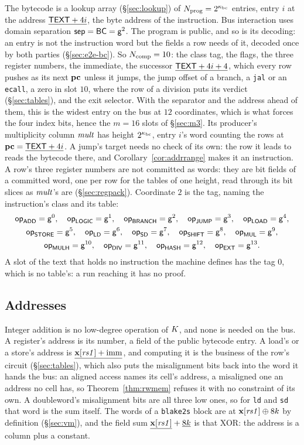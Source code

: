 The bytecode is a lookup array (\S\ref{sec:lookup}) of $N_{\mathrm{prog}} = 2^{\kappa_{\mathrm{bc}}}$ entries, entry $i$ at the address $\underline{\mathsf{TEXT}+4i}$, the byte address of the instruction. Bus interaction uses domain separation $\mathsf{sep}=\mathsf{BC} = \mathsf{g}^{2}$. The program is public, and so is its decoding: an entry is not the instruction word but the fields a row needs of it, decoded once by both parties (\S\ref{sec:e2e-bc}). So $N_{\mathrm{comp}}=10$: the class tag, the flags, the three register numbers, the immediate, the successor $\underline{\mathsf{TEXT}+4i+4}$, which every row pushes as its next $\mathbf{pc}$ unless it jumps, the jump offset of a branch, a \texttt{jal} or an \texttt{ecall}, a zero in slot $10$, where the row of a division puts its verdict (\S\ref{sec:tables}), and the exit selector. With the separator and the address ahead of them, this is the widest entry on the bus at $12$ coordinates, which is what forces the four index bits, hence the $m=16$ slots of \S\ref{sec:m3}. Its producer's multiplicity column $\mathit{mult}$ has height $2^{\kappa_{\mathrm{bc}}}$, entry $i$'s word counting the rows at $\mathbf{pc}=\underline{\mathsf{TEXT}+4i}$. A jump's target needs no check of its own: the row it leads to reads the bytecode there, and Corollary~\ref{cor:addrrange} makes it an instruction. A row's three register numbers are not committed as words: they are bit fields of a committed word, one per row for the tables of one height, read through its bit slices as $\mathit{mult}$'s are (\S\ref{sec:regpack}). Coordinate $2$ is the tag, naming the instruction's class and its table:
\begin{gather*}
  \mathsf{op}_{\mathsf{ADD}}=\mathsf{g}^{0},\quad \mathsf{op}_{\mathsf{LOGIC}}=\mathsf{g}^{1},\quad \mathsf{op}_{\mathsf{BRANCH}}=\mathsf{g}^{2},\quad \mathsf{op}_{\mathsf{JUMP}}=\mathsf{g}^{3},\quad \mathsf{op}_{\mathsf{LOAD}}=\mathsf{g}^{4},\\
  \mathsf{op}_{\mathsf{STORE}}=\mathsf{g}^{5},\quad \mathsf{op}_{\mathsf{LD}}=\mathsf{g}^{6},\quad \mathsf{op}_{\mathsf{SD}}=\mathsf{g}^{7},\quad \mathsf{op}_{\mathsf{SHIFT}}=\mathsf{g}^{8},\quad \mathsf{op}_{\mathsf{MUL}}=\mathsf{g}^{9},\\
  \mathsf{op}_{\mathsf{MULH}}=\mathsf{g}^{10},\quad \mathsf{op}_{\mathsf{DIV}}=\mathsf{g}^{11},\quad \mathsf{op}_{\mathsf{HASH}}=\mathsf{g}^{12},\quad \mathsf{op}_{\mathsf{EXT}}=\mathsf{g}^{13}.
\end{gather*}
A slot of the text that holds no instruction the machine defines has the tag $0$, which is no table's: a run reaching it has no proof.

\subsection{Addresses}\label{sec:exp}

Integer addition is no low-degree operation of $K$, and none is needed on the bus. A register's address is its number, a field of the public bytecode entry. A load's or a store's address is $\underline{\mathbf{x}[\mathit{rs1}]+\mathrm{imm}}$, and computing it is the business of the row's circuit (\S\ref{sec:tables}), which also puts the misalignment bits back into the word it hands the bus: an aligned access names its cell's address, a misaligned one an address no cell has, so Theorem~\ref{thm:rwmem} refuses it with no constraint of its own. A doubleword's misalignment bits are all three low ones, so for \texttt{ld} and \texttt{sd} that word is the sum itself. The words of a \texttt{blake2s} block are at $\mathbf{x}[\mathit{rs1}]\oplus8k$ by definition (\S\ref{sec:vm}), and the field sum $\underline{\mathbf{x}[\mathit{rs1}]}+\underline{8k}$ is that XOR: the address is a column plus a constant.

